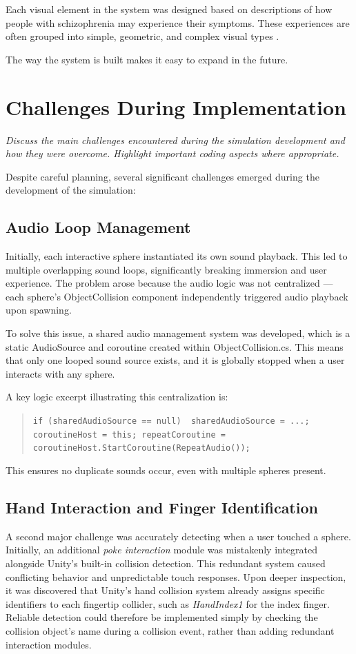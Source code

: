 Each visual element in the system was designed based on descriptions of how people with schizophrenia may experience their symptoms. These experiences are often grouped into simple, geometric, and complex visual types \cite{Silverstein2021,Vanommen2019}.

The way the system is built makes it easy to expand in the future.

\section{Challenges During Implementation} \emph{Discuss the main challenges encountered during the simulation development and how they were overcome. Highlight important coding aspects where appropriate.}

Despite careful planning, several significant challenges emerged during the development of the simulation:

\subsection{Audio Loop Management} Initially, each interactive sphere instantiated its own sound playback. This led to multiple overlapping sound loops, significantly breaking immersion and user experience. The problem arose because the audio logic was not centralized — each sphere's ObjectCollision component independently triggered audio playback upon spawning.

To solve this issue, a shared audio management system was developed, which is a static AudioSource and coroutine created within ObjectCollision.cs. This means that only one looped sound source exists, and it is globally stopped when a user interacts with any sphere.

A key logic excerpt illustrating this centralization is:

\begin{quote} \small \texttt{if (sharedAudioSource == null) { sharedAudioSource = ...; coroutineHost = this; repeatCoroutine = coroutineHost.StartCoroutine(RepeatAudio());}} \end{quote}

This ensures no duplicate sounds occur, even with multiple spheres present.

\subsection{Hand Interaction and Finger Identification} 
A second major challenge was accurately detecting when a user touched a sphere. Initially, an additional \textit{poke interaction} module was mistakenly integrated alongside Unity's built-in collision detection. This redundant system caused conflicting behavior and unpredictable touch responses. Upon deeper inspection, it was discovered that Unity’s hand collision system already assigns specific identifiers to each fingertip collider, such as \textit{HandIndex1} for the index finger. Reliable detection could therefore be implemented simply by checking the collision object's name during a collision event, rather than adding redundant interaction modules.

